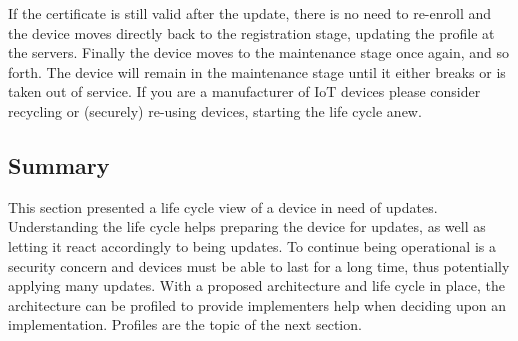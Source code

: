 \documentclass[0-thesis.tex]{subfiles}
\begin{document}
If the certificate is still valid after the update, there is no need to re-enroll and the
device moves directly back to the registration stage, updating the profile at the servers.
Finally the device moves to the maintenance stage once again, and so forth. The device
will remain in the maintenance stage until it either breaks or is taken out of service. If
you are a manufacturer of IoT devices please consider recycling or (securely) re-using
devices, starting the life cycle anew.

\subsection{Summary}
\label{ssec:life-cycle-summary}
This section presented a life cycle view of a device in need of updates. Understanding the
life cycle helps preparing the device for updates, as well as letting it react accordingly
to being updates. To continue being operational is a security concern and devices must be
able to last for a long time, thus potentially applying many updates. With a proposed
architecture and life cycle in place, the architecture can be profiled to provide
implementers help when deciding upon an implementation. Profiles are the topic of the next
section.
\end{document}
